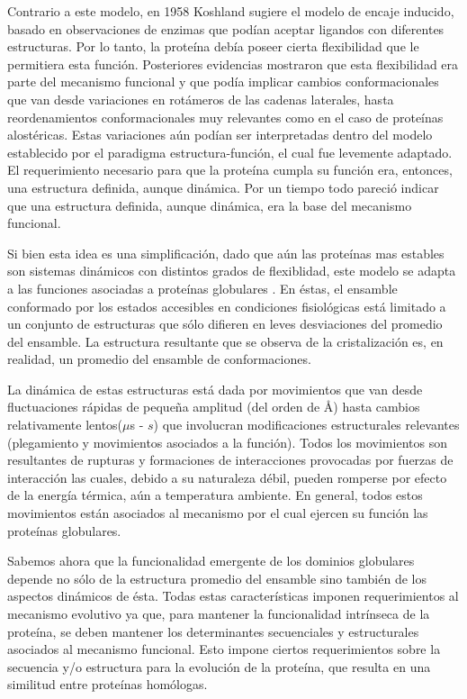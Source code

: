 Contrario a este modelo, en 1958 Koshland sugiere el modelo de encaje inducido, basado en observaciones de enzimas que podían aceptar 
ligandos con diferentes estructuras. Por lo tanto, la proteína debía poseer cierta flexibilidad que le permitiera esta función.
Posteriores evidencias mostraron que esta flexibilidad era parte del mecanismo funcional y que podía implicar cambios conformacionales que van desde variaciones en rotámeros de las cadenas laterales, hasta 
reordenamientos conformacionales muy relevantes como en el caso de proteínas alostéricas.
Estas variaciones aún podían ser interpretadas dentro del modelo establecido por el paradigma estructura-función, el cual fue levemente adaptado.
El requerimiento necesario para que la proteína cumpla su función era, entonces, una estructura definida, aunque dinámica. 
Por un tiempo todo pareció indicar que una estructura definida, aunque dinámica, era la base del mecanismo funcional.

Si bien esta idea es una simplificación, dado que aún las proteínas mas estables son sistemas dinámicos con distintos grados de flexiblidad, este modelo se adapta a las funciones asociadas a proteínas globulares \cite{karplus1981internal}.
En éstas, el ensamble conformado por los estados accesibles en condiciones fisiológicas está limitado a un conjunto de estructuras que sólo difieren en leves desviaciones del promedio del ensamble.
La estructura resultante que se observa de la cristalización es, en realidad, un promedio del ensamble de conformaciones.

La dinámica de estas estructuras está dada por movimientos que van desde fluctuaciones rápidas de pequeña amplitud (del orden de \AA) hasta cambios relativamente lentos($\mu$s - $s$) que 
involucran modificaciones estructurales relevantes (plegamiento y movimientos asociados a la función).
Todos los movimientos son resultantes de rupturas y formaciones de interacciones provocadas por fuerzas de interacción las cuales, debido a su naturaleza débil, pueden romperse 
por efecto de la energía térmica, aún a temperatura ambiente. En general, todos estos movimientos están asociados al mecanismo por el cual ejercen su función las proteínas globulares.





Sabemos ahora que la funcionalidad emergente de los dominios globulares depende no sólo de la estructura promedio del ensamble sino también de los aspectos dinámicos de ésta.
Todas estas características imponen requerimientos al mecanismo evolutivo ya que, para mantener la funcionalidad intrínseca de la proteína, se deben mantener los determinantes secuenciales y estructurales asociados al mecanismo funcional.
Esto impone ciertos requerimientos sobre la secuencia y/o estructura para la evolución de la proteína, que resulta en una similitud entre proteínas homólogas.

